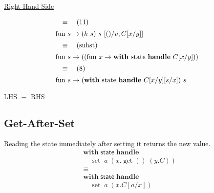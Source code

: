 \documentclass[logo,bsc,singlespacing,parskip]{infthesis}
\begin{document}
\underline{Right Hand Side}

\[ 
\begin{array}{l}
\quad\equiv\quad (11) \\[5pt]
\text{fun } s \rightarrow (k\ s)\ s\ [()/v, C[x/y]] \\[5pt]
\quad\equiv\quad (\text{subst}) \\[5pt]
\text{fun } s \rightarrow ((\text{fun } x \rightarrow \text{\textbf{with} state \textbf{handle} } C[x/y])) \\[5pt]
\quad\equiv\quad (8) \\[5pt]
\text{fun } s \rightarrow (\text{\textbf{with} state \textbf{handle} } C[x/y][s/x])\ s
\end{array}
\]

LHS $\equiv$ RHS



\subsection*{Get-After-Set}
Reading the state immediately after setting it returns the new value.
\[
\begin{aligned}
    &\mathsf{\textbf{with}} \; \mathsf{state} \; \mathsf{\textbf{handle}} \\
    &\quad \operatorname{set} \; a \; (x. \operatorname{get}() \; (y. C)) \\
    &\equiv \\
    &\mathsf{\textbf{with}} \; \mathsf{state} \; \mathsf{\textbf{handle}} \\
    &\quad \operatorname{set} \; a \; (x. C[a/x])
\end{aligned}
\]
\end{document}
